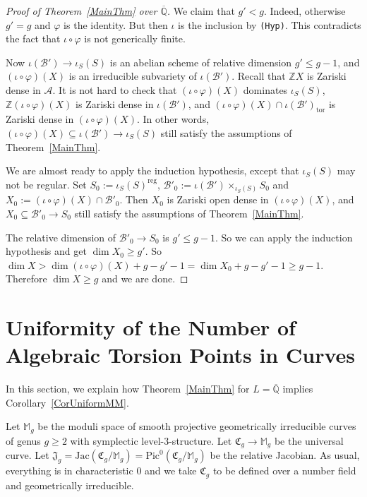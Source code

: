 \documentclass[12pt,oneside]{amsart}
\numberwithin{maincounter}{section}
\numberwithin{equation}{section}
\def\ZZ{\mathbb{Z}}
\def\QQ{\mathbb{Q}}
\newcommand{\cal}{\mathcal}
\newcommand{\cA}{\cal{A}}
\newcommand{\cB}{\cal{B}}
\newcommand{\IQbar}{{\overline{\QQ}}}
\newcommand{\IZ}{{\ZZ}}
\begin{document}
\begin{proof}[Proof of Theorem~\ref{MainThm} over $\IQbar$]
We claim that $g' < g$. Indeed, otherwise $g' = g$ and $\varphi$ is the identity. But then $\iota$ is the inclusion by {\tt (Hyp)}. This contradicts the fact that $\iota\circ \varphi$ is not generically finite.%

Now $\iota(\cB') \rightarrow \iota_S(S)$ is an abelian scheme of
relative dimension $g' \le g-1$, and $(\iota\circ\varphi)(X)$ is an
irreducible subvariety of $\iota(\cB')$.
Recall that $\IZ X$ is Zariski dense in $\cA$. It is not hard to check that $(\iota\circ\varphi)(X)$ dominates $\iota_S(S)$, $\mathbb{Z}(\iota\circ\varphi)(X)$ is Zariski dense in $\iota(\cB')$, and $(\iota\circ\varphi)(X) \cap \iota(\cB')_{\mathrm{tor}}$ is Zariski dense in $(\iota\circ\varphi)(X)$. In other words,  $(\iota\circ\varphi)(X) \subseteq \iota(\cB') \rightarrow \iota_S(S)$ still satisfy the assumptions of Theorem~\ref{MainThm}.

We are almost ready to apply the induction hypothesis, except that $\iota_S(S)$ may not be regular. Set $S_0 := \iota_S(S)^{\mathrm{reg}}$, $\cB'_0 := \iota(\cB') \times_{\iota_S(S)} S_0$ and $X_0 := (\iota\circ\varphi)(X) \cap \cB'_0$. Then $X_0$ is Zariski open dense in $(\iota\circ\varphi)(X)$, and $X_0 \subseteq \cB'_0 \rightarrow S_0$ still satisfy the assumptions of Theorem~\ref{MainThm}.

The relative dimension of $\cB'_0 \rightarrow S_0$ is $g' \le g-1$. So we can apply the induction hypothesis and get $\dim X_0 \ge g'$. So $\dim X > \dim (\iota\circ\varphi)(X) + g-g'-1 = \dim X_0 + g-g'-1 \ge g-1$. Therefore $\dim X \ge g$ and we are done.
\end{proof}



\section{Uniformity of the Number of Algebraic Torsion Points in
  Curves}
\label{SectionUnifMM}
In this section, we explain how Theorem~\ref{MainThm} for $L=\IQbar$
implies Corollary~\ref{CorUniformMM}.


Let $\mathbb{M}_g$ be the moduli space of smooth projective
geometrically irreducible curves of genus $g\ge 2$ with symplectic
level-$3$-structure. Let $\mathfrak{C}_g \rightarrow \mathbb{M}_g$
be the universal curve. Let $\mathfrak{J}_g =
\mathrm{Jac}(\mathfrak{C}_g/\mathbb{M}_g) = \mathrm{Pic}^0(\mathfrak{C}_g/\mathbb{M}_g)$ be the relative Jacobian.
As usual, everything is in characteristic $0$ and we take
$\mathfrak{C}_g$ to be defined over a number field and geometrically
irreducible.
\end{document}
